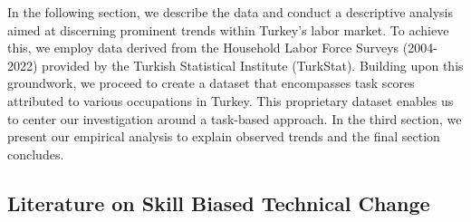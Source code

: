 \begin{onehalfspace}
In the following section, we describe the data and conduct a descriptive
analysis aimed at discerning prominent trends within Turkey's labor
market. To achieve this, we employ data derived from the Household
Labor Force Surveys (2004-2022) provided by the Turkish Statistical
Institute (TurkStat). Building upon this groundwork, we proceed to
create a dataset that encompasses task scores attributed to various
occupations in Turkey. This proprietary dataset enables us to center
our investigation around a task-based approach. In the third section,
we present our empirical analysis to explain observed trends and the
final section concludes.
\end{onehalfspace}

\subsection{Literature on Skill Biased Technical Change}

